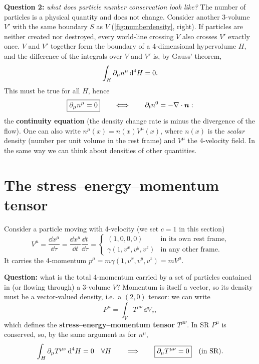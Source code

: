 \textbf{Question 2:} \emph{what does particle number conservation look like?} The number of particles is a physical quantity and does not change. Consider another 3-volume $V'$ with the same boundary $S$ as $V$ (\cref{fig:numberdensity}, right). If particles are neither created nor destroyed, every world-line crossing $V$ also crosses $V'$ exactly once. $V$ and $V'$ together form the boundary of a 4-dimensional hypervolume $H$, and the difference of the integrals over $V$ and $V'$ is, by Gauss' theorem,
\begin{equation}
  \int_H\partial_\mu n^\mu\,\mathrm{d}^4H=0 .
\end{equation}
This must be true for all $H$, hence
\begin{equation}
  \boxed{\partial_\mu n^\mu=0}\qquad\Longleftrightarrow\qquad\partial_t n^0=-\nabla\cdot\bm{n} :
\end{equation}
the \textbf{continuity equation} (the density change rate is minus the divergence of the flow). One can also write $n^\mu(x)=n(x)V^\mu(x)$, where $n(x)$ is the \emph{scalar} density (number per unit volume in the rest frame) and $V^\mu$ the 4-velocity field. In the same way we can think about densities of other quantities.

\section{The stress--energy--momentum tensor}

Consider a particle moving with 4-velocity (we set $c=1$ in this section)
\begin{equation}
  V^\mu=\frac{\dd x^\mu}{\dd\tau}=\frac{\dd x^\mu}{\dd t}\frac{\dd t}{\dd\tau}=\begin{cases}(1,0,0,0)&\text{in its own rest frame},\\ \gamma(1,v^x,v^y,v^z)&\text{in any other frame.}\end{cases}
\end{equation}
It carries the 4-momentum $p^\mu=m\gamma(1,v^x,v^y,v^z)=mV^\mu$.

\textbf{Question:} what is the total 4-momentum carried by a set of particles contained in (or flowing through) a 3-volume $V$? Momentum is itself a vector, so its density must be a vector-valued density, i.e.\ a $(2,0)$ tensor: we can write
\begin{equation}
  P^\mu=\int_V T^{\mu\nu}\,\dd V_\nu ,
\end{equation}
which defines the \textbf{stress--energy--momentum tensor} $T^{\mu\nu}$. In SR $P^\mu$ is conserved, so, by the same argument as for $n^\mu$,
\begin{equation}
  \int_H\partial_\mu T^{\mu\nu}\,\mathrm{d}^4H=0\quad\forall H\qquad\Longrightarrow\qquad\boxed{\partial_\mu T^{\mu\nu}=0}\quad\text{(in SR)}.
\end{equation}

